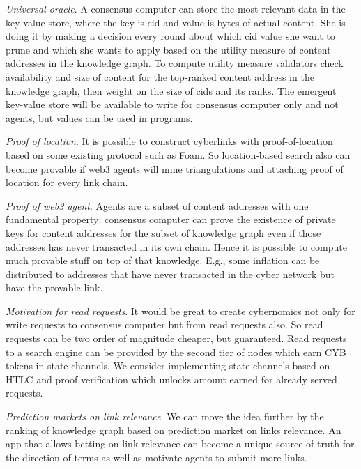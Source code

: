 \documentclass[10pt,oneside]{amsart}
\begin{document}
\textit{Universal oracle}. A consensus computer can store the most relevant data in the key-value store, where the key is cid and value is bytes of actual content. She is doing it by making a decision every round about which cid value she want to prune and which she wants to apply based on the utility measure of content addresses in the knowledge graph. To compute utility measure validators check availability and size of content for the top-ranked content address in the knowledge graph, then weight on the size of cids and its ranks. The emergent key-value store will be available to write for consensus computer only and not agents, but values can be used in programs.

\textit{Proof of location}. It is possible to construct cyberlinks with proof-of-location based on some existing protocol such as \href{https://ipfs.io/ipfs/QmZYKGuLHf2h1mZrhiP2FzYsjj3tWt2LYduMCRbpgi5pKG}{Foam}. So location-based search also can become provable if web3 agents will mine triangulations and attaching proof of location for every link chain.

\textit{Proof of web3 agent}. Agents are a subset of content addresses with one fundamental property: consensus computer can prove the existence of private keys for content addresses for the subset of knowledge graph even if those addresses has never transacted in its own chain. Hence it is possible to compute much provable stuff on top of that knowledge. E.g., some inflation can be distributed to addresses that have never transacted in the cyber network but have the provable link.

\textit{Motivation for read requests}. It would be great to create cybernomics not only for write requests to consensus computer but from read requests also. So read requests can be two order of magnitude cheaper, but guaranteed. Read requests to a search engine can be provided by the second tier of nodes which earn CYB tokens in state channels. We consider implementing state channels based on HTLC and proof verification which unlocks amount earned for already served requests.

\textit{Prediction markets on link relevance}. We can move the idea further by the ranking of knowledge graph based on prediction market on links relevance. An app that allows betting on link relevance can become a unique source of truth for the direction of terms as well as motivate agents to submit more links.
\end{document}
